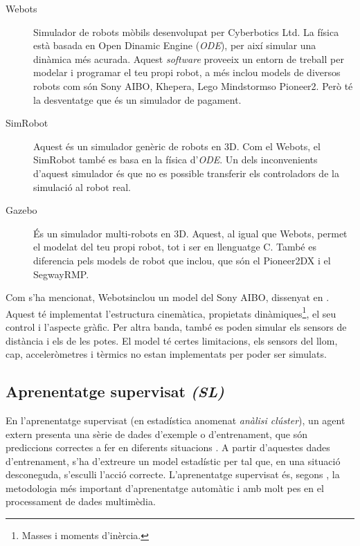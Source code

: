 \documentclass[12pt,a4paper,final,twoside]{report}
\begin{document}
\begin{description}
\item[Webots\texttrademark] \cite{Michel2004} Simulador de robots mòbils desenvolupat per Cyberbotics Ltd. La física està basada en Open Dinamic Engine (\textit{ODE}), per així simular una dinàmica més acurada. Aquest \textit{software} proveeix un entorn de treball per modelar i programar el teu propi robot, a més inclou models de diversos robots com són Sony AIBO, Khepera, Lego Mindstorms\texttrademark o Pioneer2. Però té la desventatge que és un simulador de pagament.

\item[SimRobot] \cite{Laue2006a} Aquest és un simulador genèric de robots en 3D. Com el Webots\texttrademark , el SimRobot també es basa en la física d'\textit{ODE}. Un dels inconvenients d'aquest simulador és que no es possible transferir els controladors de la simulació al robot real.

\item[Gazebo] \cite{Khatib2002} És un simulador multi-robots en 3D. Aquest, al igual que Webots\texttrademark , permet el modelat del teu propi robot, tot i ser en llenguatge C. També es diferencia pels models de robot que inclou, que són el Pioneer2DX i el SegwayRMP.
\end{description}

Com s'ha mencionat, Webots\texttrademark inclou un model del Sony AIBO, dissenyat en \cite{Hohl2006}. Aquest té implementat l'estructura cinemàtica, propietats dinàmiques\footnote{Masses i moments d'inèrcia.}, el seu control i l'aspecte gràfic. Per altra banda, també es poden simular els sensors de distància i els de les potes. El model té certes limitacions, els sensors del llom, cap, acceleròmetres i tèrmics no estan implementats per poder ser simulats. 


\subsection{Aprenentatge supervisat \textit{(SL)}}

En l'aprenentatge supervisat (en estadística anomenat \textit{anàlisi clúster}), un agent extern presenta una sèrie de dades d'exemple o d'entrenament, que són prediccions correctes a fer en diferents situacions \cite{Kober2009}. A partir d'aquestes dades d'entrenament, s'ha d'extreure un model estadístic per tal que, en una situació desconeguda, s'esculli l'acció correcte. L'aprenentatge supervisat és, segons \cite{Cord2008}, la metodologia més important d'aprenentatge automàtic i amb molt pes en el processament de dades multimèdia.
\end{document}
